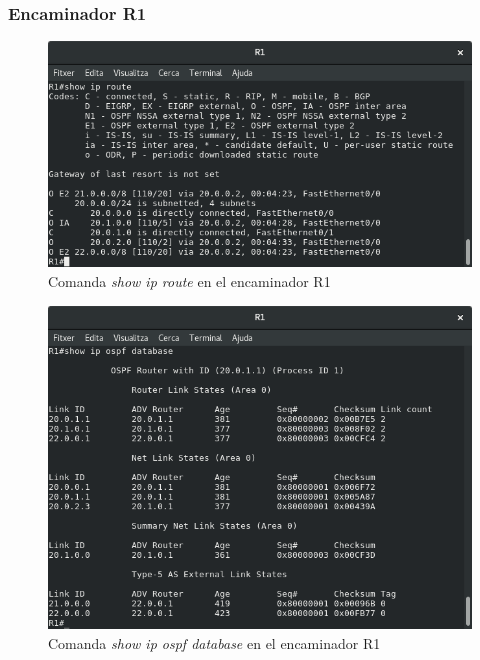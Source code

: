\documentclass[10pt]{article}
\begin{document}
\subsubsection{Encaminador R1}
\begin{figure}[H]
\begin{center}
\includegraphics[scale=0.5]{Images/ospf-R1-route.png}
\caption{Comanda \textit{show ip route} en el encaminador R1}
\end{center}
\end{figure}
\begin{figure}[H]
\begin{center}
\includegraphics[scale=0.5]{Images/ospf-R1-database.png}
\caption{Comanda \textit{show ip ospf database} en el encaminador R1}
\end{center}
\end{figure}
\end{document}
